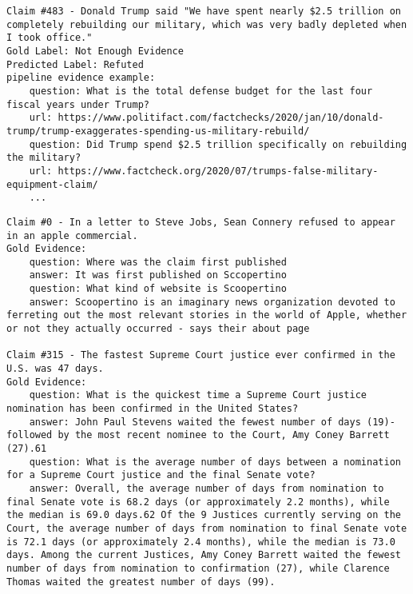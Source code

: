 \documentclass[oneside]{ctuthesis}
\theoremstyle{plain}
\theoremstyle{definition}
\theoremstyle{note}
\begin{document}
\begin{lstlisting}[caption={An example of a claim where the evidence consists mainly of evidence from PolitiFact and Factcheck.org fact-checking articles leading to different predicted label than in the gold dataset}, label={lst:polifact_leakage}, breaklines=true, breakatwhitespace=false, columns=fullflexible]
Claim #483 - Donald Trump said "We have spent nearly $2.5 trillion on completely rebuilding our military, which was very badly depleted when I took office."
Gold Label: Not Enough Evidence
Predicted Label: Refuted
pipeline evidence example: 
    question: What is the total defense budget for the last four fiscal years under Trump?
    url: https://www.politifact.com/factchecks/2020/jan/10/donald-trump/trump-exaggerates-spending-us-military-rebuild/
    question: Did Trump spend $2.5 trillion specifically on rebuilding the military?
    url: https://www.factcheck.org/2020/07/trumps-false-military-equipment-claim/
    ...
\end{lstlisting}
\pagebreak
\begin{lstlisting}[caption={An example of a claims which differs in length.}, label={lst:different_lengths}, breaklines=true, breakatwhitespace=false, columns=fullflexible]
Claim #0 - In a letter to Steve Jobs, Sean Connery refused to appear in an apple commercial.
Gold Evidence:
    question: Where was the claim first published
    answer: It was first published on Sccopertino
    question: What kind of website is Scoopertino
    answer: Scoopertino is an imaginary news organization devoted to ferreting out the most relevant stories in the world of Apple, whether or not they actually occurred - says their about page

Claim #315 - The fastest Supreme Court justice ever confirmed in the U.S. was 47 days.
Gold Evidence:
    question: What is the quickest time a Supreme Court justice nomination has been confirmed in the United States?
    answer: John Paul Stevens waited the fewest number of days (19)-followed by the most recent nominee to the Court, Amy Coney Barrett (27).61
    question: What is the average number of days between a nomination for a Supreme Court justice and the final Senate vote?
    answer: Overall, the average number of days from nomination to final Senate vote is 68.2 days (or approximately 2.2 months), while the median is 69.0 days.62 Of the 9 Justices currently serving on the Court, the average number of days from nomination to final Senate vote is 72.1 days (or approximately 2.4 months), while the median is 73.0 days. Among the current Justices, Amy Coney Barrett waited the fewest number of days from nomination to confirmation (27), while Clarence Thomas waited the greatest number of days (99).
\end{lstlisting}
\end{document}
